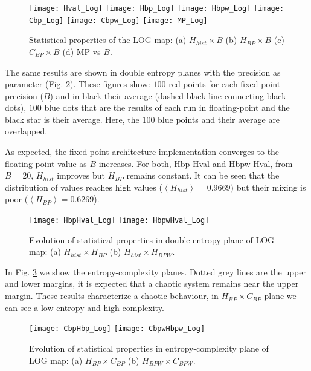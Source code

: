 \begin{figure}
	\texttt{[image: Hval\_Log]}
	\texttt{[image: Hbp\_Log]}
	\texttt{[image: Hbpw\_Log]}
	\texttt{[image: Cbp\_Log]}
	\texttt{[image: Cbpw\_Log]}
	\texttt{[image: MP\_Log]}
	\caption{Statistical properties of the LOG map: (a) $H_{hist} \times B$ (b) $H_{BP} \times B$ (c) $C_{BP} \times B$ (d) MP vs $B$.}
	\label{fig:LOG_QuantiB}
\end{figure}

The same results are shown in double entropy planes with the precision as parameter (Fig. \ref{fig:LOG_HH}).
These figures show: $100$ red points for each fixed-point precision ($B$) and in black their average (dashed black line connecting black dots), $100$ blue dots that are the results of each run in floating-point and the black star is their average.
Here, the $100$ blue points and their average are overlapped.

As expected, the fixed-point architecture implementation converges to the floating-point value as $B$ increases.
For both, Hbp-Hval and Hbpw-Hval, from $B=20$, $H_{hist}$ improves but $H_{BP}$ remains constant.
It can be seen that the distribution of values reaches high values ($\left\langle H_{hist}\right\rangle =0.9669$) but their mixing is poor ($\left\langle H_{BP}\right\rangle =0.6269$).

\begin{figure}
	\texttt{[image: HbpHval\_Log]}
	\texttt{[image: HbpwHval\_Log]}
	\caption{Evolution of statistical properties in double entropy plane of LOG map: (a) $H_{hist} \times H_{BP}$ (b) $H_{hist} \times H_{BPW}$.}
	\label{fig:LOG_HH}
\end{figure}

In Fig. \ref{fig:LOG_HC} we show the entropy-complexity planes.
Dotted grey lines are the upper and lower margins, it is expected that a chaotic system remains near the upper margin.
These results characterize a chaotic behaviour, in $H_{BP} \times C_{BP}$ plane we can see a low entropy and high complexity.

\begin{figure}
	\texttt{[image: CbpHbp\_Log]}
	\texttt{[image: CbpwHbpw\_Log]}
	\caption{Evolution of statistical properties in entropy-complexity plane of LOG map: (a) $H_{BP} \times C_{BP}$ (b) $H_{BPW} \times C_{BPW}$.}
	\label{fig:LOG_HC}
\end{figure}
